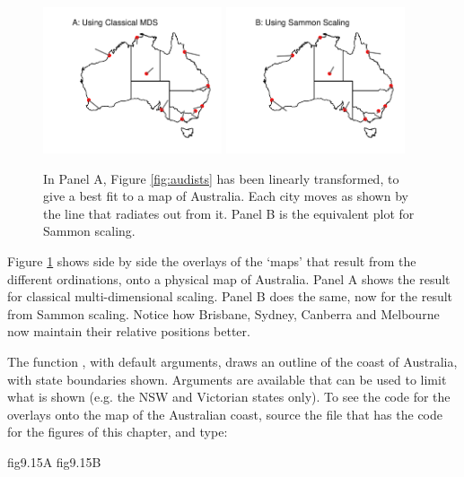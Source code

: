 \begin{figure}[h]
\begin{Schunk}


\centerline{\includegraphics[width=0.47\textwidth]{figs/9-au-both-1} \includegraphics[width=0.47\textwidth]{figs/9-au-both-2} }

\end{Schunk}
      \caption{In Panel A, Figure \ref{fig:audists} has been linearly
        transformed, to give a best fit to a map of Australia.  Each city
        moves as shown by the line that radiates out from it.  Panel B
        is the equivalent plot for Sammon scaling.
\label{fig:aufit}}
 \end{figure}
 Figure \ref{fig:aufit} shows side by side the overlays of the
 `maps' that result from the different ordinations, onto a physical
 map of Australia.  Panel A shows the result for classical
 multi-dimensional scaling.  Panel B does the same, now for the
 result from Sammon scaling.  Notice how Brisbane, Sydney, Canberra
 and Melbourne now maintain their relative positions better.

The function , with default arguments, draws an
outline of the coast of Australia, with state boundaries shown.
Arguments are available that can be used to limit what is shown 
(e.g. the NSW and Victorian states only).
To see the code for the overlays onto the map of the Australian
coast, source the file that has the code for the figures of this
chapter, and type:
\begin{Schunk}
\begin{Sinput}
fig9.15A
fig9.15B
\end{Sinput}
\end{Schunk}

